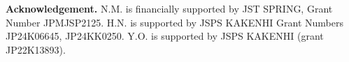 \documentclass[a4paper,reqno,10pt]{amsart}
\theoremstyle{definition}
\theoremstyle{definition}
\theoremstyle{definition}
\theoremstyle{definition}
\theoremstyle{plain}
\begin{document}
\medskip
\noindent
{\bf Acknowledgement.}
N.M. %
is financially supported by JST SPRING, Grant Number JPMJSP2125.
H.N. is supported by JSPS KAKENHI Grant Numbers JP24K06645, JP24KK0250.
Y.O. is supported by JSPS KAKENHI (grant JP22K13893).




\end{document}
